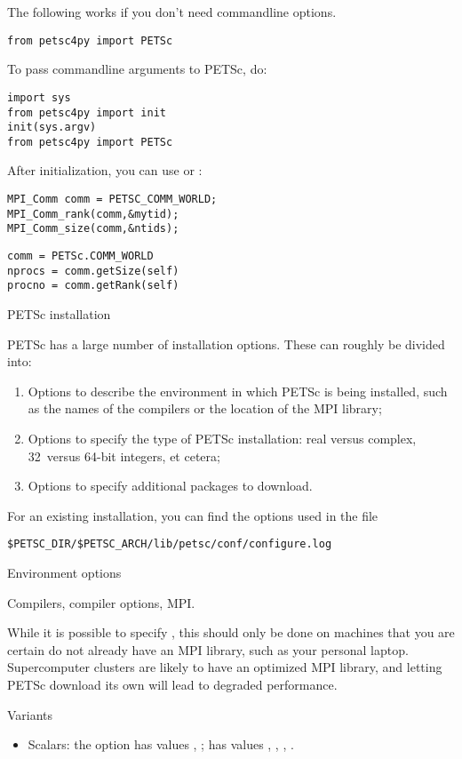 \begin{pythonnote}
  The following works if you don't need commandline options.
\begin{verbatim}
from petsc4py import PETSc
\end{verbatim}
To pass commandline arguments to PETSc, do:
\begin{verbatim}
import sys
from petsc4py import init
init(sys.argv)
from petsc4py import PETSc
\end{verbatim}
\end{pythonnote}

After initialization, you can use  or
:

\begin{lstlisting}
MPI_Comm comm = PETSC_COMM_WORLD;
MPI_Comm_rank(comm,&mytid);
MPI_Comm_size(comm,&ntids);
\end{lstlisting}

\begin{pythonnote}
\begin{verbatim}
comm = PETSc.COMM_WORLD
nprocs = comm.getSize(self) 
procno = comm.getRank(self)
\end{verbatim}
\end{pythonnote}

 {PETSc installation}

PETSc has a large number of installation options. These can roughly be
divided into:
\begin{enumerate}
\item Options to describe the environment in which PETSc is being
  installed, such as the names of the compilers or the location of the
  MPI library;
\item Options to specify the type of PETSc installation: real versus
  complex, 32~versus 64-bit integers, et cetera;
\item Options to specify additional packages to download.
\end{enumerate}

For an existing installation, you can find the options used in the
file
\begin{verbatim}
$PETSC_DIR/$PETSC_ARCH/lib/petsc/conf/configure.log
\end{verbatim}

 {Environment options}

Compilers, compiler options, MPI.

While it is possible to specify ,
this should only be done on machines that you are certain do not
already have an MPI library, such as your personal
laptop. Supercomputer clusters are likely to have an optimized MPI
library, and letting PETSc download its own will lead to degraded
performance.

 {Variants}

\begin{itemize}
\item Scalars: the option  has values
  , ;  has values
  , , , .
\end{itemize}
